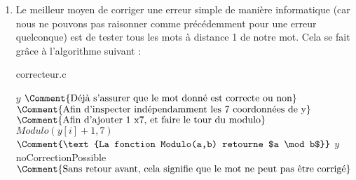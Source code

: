 \documentclass[10p,a4paper]{scrartcl}
\renewcommand{\(}{\left(}
\renewcommand{\)}{\right)}
\begin{document}
\begin{enumerate}
	\item	Le meilleur moyen de corriger une erreur simple de manière informatique (car nous ne pouvons pas raisonner comme précédemment pour une erreur quelconque) est de tester tous les mots à distance 1 de notre mot. Cela se fait grâce à l'algorithme suivant : 
	\newpage ~
			\begin{algorithm}
				\caption{correcteur.c}
				\label{correcteur}
				\begin{algorithmic}
						\State \Return $y$							$\Comment{\text{Déjà s'assurer que le mot donné est correcte ou non}}$
					\Else	
											$\Comment{\text{Afin d'inspecter indépendamment les 7 coordonnées de y}}$
											$\Comment{\text{Afin d'ajouter 1 x7, et faire le tour du modulo}}$
								\State $Modulo(y[i] + 1, 7)$		$\Comment{\text{La fonction Modulo(a,b) retourne $a \mod b$}}$
									\State \Return $y$
								\EndIf
							\EndFor					
						\EndFor
						\State \Return noCorrectionPossible			$\Comment{\text{Sans retour avant, cela signifie que le mot ne peut pas être corrigé}}$
					\EndIf
				\end{algorithmic}
			\end{algorithm}
			
\end{enumerate}
\end{document}
